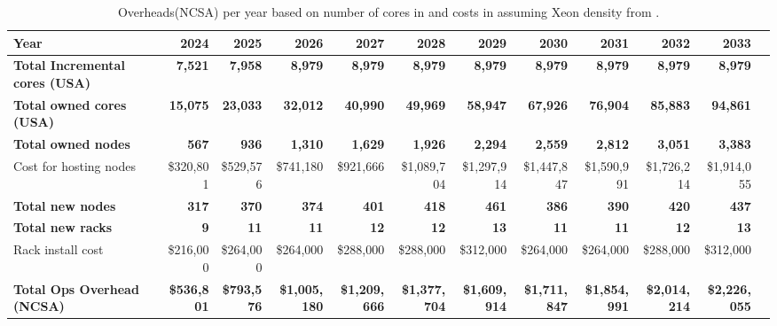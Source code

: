 \tiny \begin{longtable} { |p{}  |r  |r  |r  |r  |r  |r  |r  |r  |r  |r  |r |} 
\caption{Overheads(NCSA) per year based on number of cores in  and costs in  assuming Xeon density from .  \label{tab:opsOverheadCost}}\\ 
\hline 
\textbf{Year}&\textbf{2024}&\textbf{2025}&\textbf{2026}&\textbf{2027}&\textbf{2028}&\textbf{2029}&\textbf{2030}&\textbf{2031}&\textbf{2032}&\textbf{2033} \\ \hline
\textbf{Total Incremental cores (USA)}&\textbf{7,521}&\textbf{7,958}&\textbf{8,979}&\textbf{8,979}&\textbf{8,979}&\textbf{8,979}&\textbf{8,979}&\textbf{8,979}&\textbf{8,979}&\textbf{8,979} \\ \hline
\textbf{Total owned cores (USA)}&\textbf{15,075}&\textbf{23,033}&\textbf{32,012}&\textbf{40,990}&\textbf{49,969}&\textbf{58,947}&\textbf{67,926}&\textbf{76,904}&\textbf{85,883}&\textbf{94,861} \\ \hline
\textbf{Total owned nodes}&\textbf{567}&\textbf{936}&\textbf{1,310}&\textbf{1,629}&\textbf{1,926}&\textbf{2,294}&\textbf{2,559}&\textbf{2,812}&\textbf{3,051}&\textbf{3,383} \\ \hline
{Cost for hosting nodes }&{\$320,801}&{\$529,576}&{\$741,180}&{\$921,666}&{\$1,089,704}&{\$1,297,914}&{\$1,447,847}&{\$1,590,991}&{\$1,726,214}&{\$1,914,055} \\ \hline
\textbf{Total new nodes}&\textbf{317}&\textbf{370}&\textbf{374}&\textbf{401}&\textbf{418}&\textbf{461}&\textbf{386}&\textbf{390}&\textbf{420}&\textbf{437} \\ \hline
\textbf{Total new racks}&\textbf{9}&\textbf{11}&\textbf{11}&\textbf{12}&\textbf{12}&\textbf{13}&\textbf{11}&\textbf{11}&\textbf{12}&\textbf{13} \\ \hline
{Rack install cost }&{\$216,000}&{\$264,000}&{\$264,000}&{\$288,000}&{\$288,000}&{\$312,000}&{\$264,000}&{\$264,000}&{\$288,000}&{\$312,000} \\ \hline
\textbf{Total Ops Overhead (NCSA)}&\textbf{\$536,801}&\textbf{\$793,576}&\textbf{\$1,005,180}&\textbf{\$1,209,666}&\textbf{\$1,377,704}&\textbf{\$1,609,914}&\textbf{\$1,711,847}&\textbf{\$1,854,991}&\textbf{\$2,014,214}&\textbf{\$2,226,055} \\ \hline
\end{longtable} \normalsize
